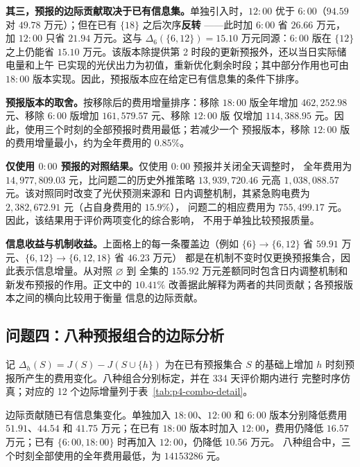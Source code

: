 \textbf{其三，预报的边际贡献取决于已有信息集。}单独引入时，$12{:}00$
优于 $6{:}00$（$94.59$ 对 $49.78$ 万元）；但在已有 $\{18\}$ 之后次序\textbf{反转}
——此时加 $6{:}00$ 省 $26.66$ 万元，加 $12{:}00$ 只省 $21.94$ 万元。这与
$\Delta_6(\{6,12\})=15.10$ 万元同源：$6{:}00$ 版在 $\{12\}$ 之上仍能省
$15.10$ 万元。该版本除提供第 2 时段的更新预报外，还以当日实际储电量和上午
已实现的光伏出力为初值，重新优化剩余时段；其中部分作用也可由 $18{:}00$
版本实现。因此，预报版本应在给定已有信息集的条件下排序。

\textbf{预报版本的取舍。}按移除后的费用增量排序：移除 $18{:}00$ 版全年增加
$462{,}252.98$ 元、移除 $6{:}00$ 版增加 $161{,}579.57$ 元、移除 $12{:}00$ 版
仅增加 $114{,}388.95$ 元。因此，使用三个时刻的全部预报时费用最低；若减少一个
预报版本，移除 $12{:}00$ 版的费用增量最小，约为全年费用的
$0.85\%$。

\textbf{仅使用 $0{:}00$ 预报的对照结果。}仅使用 $0{:}00$ 预报并关闭全天调整时，
全年费用为 $14{,}977{,}809.03$ 元，比问题二的历史外推策略
$13{,}939{,}720.46$ 元高 $1{,}038{,}088.57$ 元。该对照同时改变了光伏预测来源和
日内调整机制，其紧急购电费为 $2{,}382{,}672.91$ 元（占自身费用的 $15.9\%$），
问题二的相应费用为 $755{,}499.17$ 元。因此，该结果用于评价两项变化的综合影响，
不用于单独比较预报质量。

\textbf{信息收益与机制收益。}上面格上的每一条覆盖边（例如
$\{6\}\to\{6,12\}$ 省 $59.91$ 万元、$\{6,12\}\to\{6,12,18\}$ 省 $46.23$ 万元）
都是在机制不变时仅更换预报集合，因此表示信息增量。从对照 $\varnothing$ 到
全集的 $155.92$ 万元差额同时包含日内调整机制和新发布预报的作用。正文中的
$10.41\%$ 改善据此解释为两者的共同贡献；各预报版本之间的横向比较用于衡量
信息的边际贡献。


\subsection{问题四：八种预报组合的边际分析}
\label{app:p4-combo-detail}

记 $\Delta_h(S)=J(S)-J(S\cup\{h\})$ 为在已有预报集合 $S$ 的基础上增加
$h$ 时刻预报所产生的费用变化。八种组合分别标定，并在 334 天评价期内进行
完整时序仿真；对应的 12 个边际增量列于表~\ref{tab:p4-combo-detail}。



边际贡献随已有信息集变化。单独加入 $18{:}00$、$12{:}00$ 和 $6{:}00$
版本分别降低费用 $51.91$、$44.54$ 和 $41.75$ 万元；在已有
$18{:}00$ 版本时加入 $12{:}00$，费用仍降低 $16.57$ 万元；已有
$\{6{:}00,18{:}00\}$ 时再加入 $12{:}00$，仍降低 $10.56$ 万元。
八种组合中，三个时刻全部使用的全年费用最低，为 $14153286$ 元。

